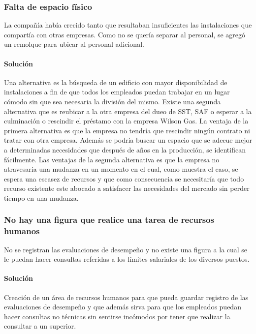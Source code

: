\documentclass[12pt,a4paper,spanish]{article}
\begin{document}
		\subsubsection{Falta de espacio f\'isico}
			La compa\~{n}\'{i}a hab\'{i}a crecido tanto que resultaban insuficientes las instalaciones que compart\'{i}a con otras empresas. Como no se quer\'{i}a separar al personal, se agreg\'{o} un remolque para ubicar al personal adicional.
		\paragraph{Soluci\'on}
			Una alternativa es la b\'{u}squeda de un edificio con mayor disponibilidad de instalaciones a fin de que todos los empleados puedan trabajar en un lugar c\'{o}modo sin que sea necesaria la divisi\'{o}n del mismo. 
			Existe una segunda alternativa que es reubicar a la otra empresa del dueo de SST, SAF o esperar a la culminaci\'{o}n  o rescindir el pr\'{e}stamo con la empresa Wilson Gas. 
			La ventaja de la primera alternativa es que la empresa no tendr\'{i}a que rescindir ning\'{u}n contrato ni tratar con otra empresa. 
			Adem\'{a}s se podr\'{i}a buscar un espacio que se adecue mejor a determinadas necesidades que despu\'{e}s de a\~{n}os en la producci\'{o}n, se identifican f\'{a}cilmente. 
			Las ventajas de la segunda alternativa es que la empresa no atravesar\'{i}a una mudanza en un momento en el cual, como muestra el caso, se espera una escasez de recursos y que como consecuencia se necesitar\'{i}a que todo recurso existente este abocado a satisfacer las necesidades del mercado sin perder tiempo en una mudanza.

		\subsubsection{No hay una figura que realice una tarea de recursos humanos}
			No se registran las evaluaciones de desempe\~{n}o y no existe una figura a la cual se le puedan hacer consultas referidas a los l\'{i}mites salariales de los diversos puestos.
		\paragraph{Soluci\'on}
			Creaci\'{o}n de un \'area de recursos humanos para que pueda guardar registro de las evaluaciones de desempe\~{n}o y que adem\'{a}s sirva para que los empleados puedan hacer consultas no t\'{e}cnicas sin sentirse inc\'{o}modos por tener que realizar la consultar a un superior.  
\end{document}
